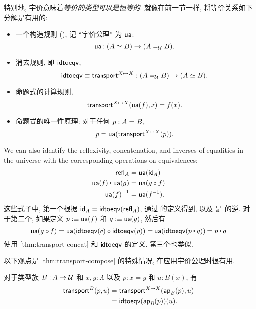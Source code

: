 特别地, 宇价意味着\emph{等价的类型可以是恒等的}.
就像在前一节一样, 将等价关系如下分解是有用的:
%
\begin{itemize}
  \item 一个构造规则 {()}, 记 ``宇价公理'' 为 $\ua$:
  \[
    \ua : ({\eqv A B}) \to (\id[\type]{A}{B}).
  \]
  \item 消去规则, 即 $\idtoeqv$,
  \[
    \idtoeqv \jdeq \transfibf{X \mapsto X} : (\id[\type]{A}{B}) \to (\eqv A B).
  \]
  \item 命题式的计算规则,
  \[
    \transfib{X \mapsto X}{\ua(f)}{x} = f(x).
  \]
  \item 命题式的唯一性原理: 
  对于任何 $p : \id A B$,
  \[
    \id{p}{\ua(\transfibf{X \mapsto X}(p))}.
  \]
\end{itemize}
%
We can also identify the reflexivity, concatenation, and inverses of equalities in the universe with the corresponding operations on equivalences:
\begin{align*}
  \refl{A} &= \ua(\idfunc[A]) \\
  \ua(f) \ct \ua(g) &= \ua(g\circ f) \\
  \opp{\ua(f)} &= \ua(f^{-1}).
\end{align*}
这些式子中, 第一个根据 $\idfunc[A] = \idtoeqv(\refl{A})$, 通过 \idtoeqv 的定义得到, 以及 \ua 是 \idtoeqv 的逆.
对于第二个, 如果定义 $p \defeq \ua(f)$ 和 $q\defeq \ua(g)$, 然后有
\[ \ua(g\circ f) = \ua(\idtoeqv(q) \circ \idtoeqv(p)) = \ua(\idtoeqv(p\ct q)) = p\ct q\]
使用 \cref{thm:transport-concat} 和 $\idtoeqv$ 的定义.
第三个也类似.

以下观点是 \cref{thm:transport-compose} 的特殊情况, 在应用宇价公理时很有用.

\begin{lem}\label{thm:transport-is-ap}
  对于类型族 $B:A\to\type$ 和 $x,y:A$ 以及 $p:x=y$ 和 $u:B(x)$, 有
  \begin{align*}
    \transfib{B}{p}{u} &= \transfib{X\mapsto X}{\apfunc{B}(p)}{u}\\
    &= \idtoeqv(\apfunc{B}(p))(u).
  \end{align*}
\end{lem}

%
%